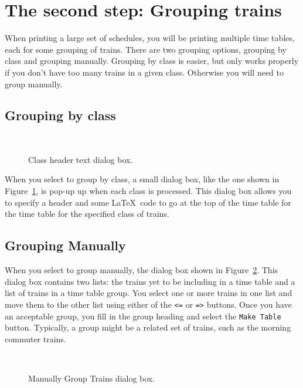 \section{The second step: Grouping trains}

When printing a large set of schedules, you will be printing multiple
time tables, each for some grouping of trains.  There are two grouping
options, grouping by class and grouping manually.  Grouping by class is
easier, but only works properly if you don't have too many trains in a
given class.  Otherwise you will need to group manually.

\subsection{Grouping by class}

\begin{figure}[h]
\begin{centering}
\\
\caption{Class header text dialog box.}
\label{fig:classGroupHeader}
\end{centering}
\end{figure} When you select to group by class, a small dialog box,
like the one shown in Figure~\ref{fig:classGroupHeader}, is pop-up up
when each class is processed.  This dialog box allows you to specify a
header and some \LaTeX\ code to go at the top of the time table for the
time table for the specified class of trains.



\subsection{Grouping Manually}

When you select to group manually, the dialog box shown in
Figure~\ref{fig:manualGroup}.  This dialog box contains two lists: the
trains yet to be including in a time table and a list of trains in a
time table group.  You select one or more trains in one list and move
them to the other list using either of the \verb"<=" or \verb"=>"
buttons.  Once you have an acceptable group, you fill in the group
heading and select the {\tt Make Table} button.  Typically, a group
might be a related set of trains, such as the morning commuter trains.

\begin{figure}
\begin{centering}
\\
\caption{Manually Group Trains dialog box.}
\label{fig:manualGroup}
\end{centering}
\end{figure}   

